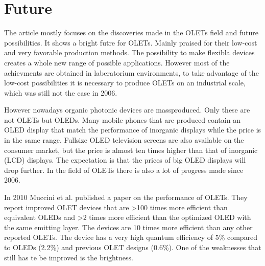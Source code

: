 \section{Future}
The article mostly focuses on the discoveries made in the OLETs field and future possibilities. It shows a bright futre for OLETs. Mainly praised for their low-cost and very favorable production methods. The possibility to make flexibla devices creates a whole new range of possible applications. However most of the achievments are obtained in laberatorium environments, to take advantage of the low-cost possibilities it is necessary to produce OLETs on an industrial scale, which was still not the case in 2006. 

However nowadays organic photonic devices are massproduced. Only these are not OLETs but OLEDs. Many mobile phones that are produced contain an OLED display that match the performance of inorganic displays while the price is in the same range. Fullsize OLED television screens are also available on the consumer market, but the price is almost ten times higher than that of inorganic (LCD) displays. The expectation is that the prices of big OLED displays will drop further. In the field of OLETs there is also a lot of progress made since 2006. 

In 2010 Muccini et al. published a paper on the performance of OLETs. They report improved OLET devices that are >100 times more efficient than equivalent OLEDs and >2 times more efficient than the optimized OLED with the same emitting layer. The devices are 10 times more efficient than any other reported OLETs. The device has a very high quantum efficiency of 5\% compared to OLEDs (2.2\%) and previous OLET designs (0.6\%). One of the weaknesses that still has te be improved is the brightness.
